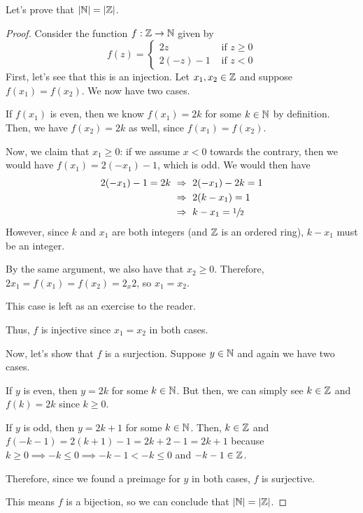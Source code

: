 \begin{example}
    Let's prove that $\lvert\mathbb{N}\rvert = \lvert\mathbb{Z}\rvert$.
\end{example}
\begin{proof}
    Consider the function $f: \mathbb{Z} \to \mathbb{N}$ given by
    \begin{equation*}
        f(z) =
        \begin{cases}
            2z        &\text{ if } z \geq 0\\
            2(-z) - 1 &\text{ if } z < 0
        \end{cases}
    \end{equation*}
    First, let's see that this is an injection.
    Let $x_1, x_2 \in \mathbb{Z}$ and suppose $f(x_1) = f(x_2)$.
    We now have two cases.

    \begin{case}[Case 1]
        If $f(x_1)$ is even, then we know $f(x_1) = 2k$ for some $k \in \mathbb{N}$ by definition.
        Then, we have $f(x_2) = 2k$ as well, since $f(x_1) = f(x_2)$.

        Now, we claim that $x_1 \geq 0$:
        if we assume $x < 0$ towards the contrary,
        then we would have $f(x_1) = 2(-x_1) - 1$, which is odd.
        We would then have
        \begin{align*}
            2(-x_1) - 1 = 2k &~\Rightarrow~ 2(-x_1) - 2k = 1\\
                             &~\Rightarrow~ 2(k - x_1) = 1\\
                             &~\Rightarrow~ k - x_1 = \sfrac{1}{2}
        \end{align*}
        However, since $k$ and $x_1$ are both integers (and $\mathbb{Z}$ is an ordered ring),
        $k - x_1$ must be an integer. \contradiction

        By the same argument, we also have that $x_2 \geq 0$.
        Therefore, $2x_1 = f(x_1) = f(x_2) = 2_x2$, so $x_1 = x_2$.
    \end{case}
    \begin{case}[Case 2]
        This case is left as an exercise to the reader.
    \end{case}
    Thus, $f$ is injective since $x_1 = x_2$ in both cases.

    Now, let's show that $f$ is a surjection.
    Suppose $y \in \mathbb{N}$ and again we have two cases.

    \begin{case}[Case 1]
        If $y$ is even, then $y = 2k$ for some $k \in \mathbb{N}$.
        But then, we can simply see $k \in \mathbb{Z}$ and $f(k) = 2k$ since $k \geq 0$.
    \end{case}
    \begin{case}[Case 2]
        If $y$ is odd, then $y = 2k + 1$ for some $k \in \mathbb{N}$.
        Then, $k \in \mathbb{Z}$ and $f(-k - 1) = 2(k + 1) - 1 = 2k + 2 - 1 = 2k + 1$
        because $k \geq 0 \implies -k \leq 0 \implies -k - 1 < -k \leq 0$ and $-k - 1 \in \mathbb{Z}$.
    \end{case}
    Therefore, since we found a preimage for $y$ in both cases, $f$ is surjective.

    This means $f$ is a bijection, so we can conclude that $\lvert\mathbb{N}\rvert = \lvert\mathbb{Z}\rvert$.
\end{proof}

